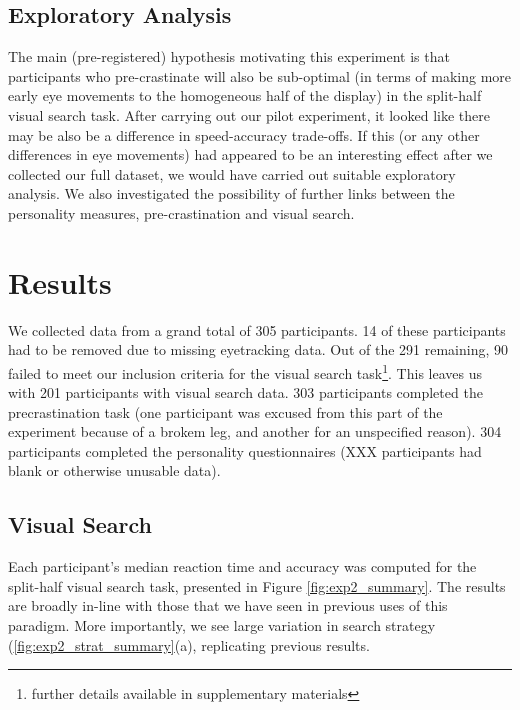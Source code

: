 \documentclass[]{rsos}
\begin{document}
\subsection{Exploratory Analysis}

The main (pre-registered) hypothesis motivating this experiment is that participants who pre-crastinate will also be sub-optimal (in terms of making more early eye movements to the homogeneous half of the display) in the split-half visual search task. After carrying out our pilot experiment, it looked like there may be also be a difference in speed-accuracy trade-offs. If this (or any other differences in eye movements) had appeared to be an interesting effect after we collected our full dataset, we would have carried out suitable exploratory analysis. We also investigated the possibility of further links between the personality measures, pre-crastination and visual search. 

\section{Results}

We collected data from a grand total of 305 participants. 14 of these participants had to be removed due to missing eyetracking data. Out of the 291 remaining, 90 failed to meet our inclusion criteria for the visual search task\footnote{further details available in supplementary materials}. This leaves us with 201 participants with visual search data. 303 participants completed the precrastination task (one participant was excused from this part of the experiment because of a brokem leg, and another for an unspecified reason). 304 participants completed the personality questionnaires (XXX participants had blank or otherwise unusable data).

\subsection{Visual Search}

Each participant’s median reaction time and accuracy was computed for the split-half visual
search task, presented in Figure \ref{fig:exp2_summary}. The results are broadly in-line with those that we have seen in previous uses of this paradigm. More importantly, we see large variation in search strategy (\ref{fig:exp2_strat_summary}(a), replicating previous results.  
\end{document}
